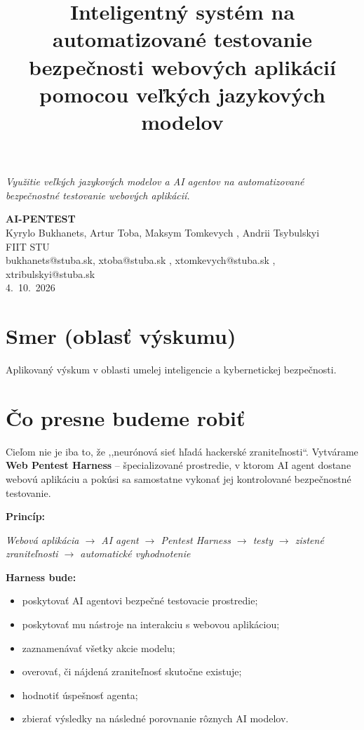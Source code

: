 \documentclass[11pt,a4paper]{article}
\title{\textbf{Inteligentný systém na automatizované testovanie bezpečnosti webových aplikácií pomocou veľkých jazykových modelov}}
\author{}
\date{}
\begin{document}
\maketitle
\vspace{-1cm}

\noindent\textit{Využitie veľkých jazykových modelov a AI agentov na automatizované bezpečnostné testovanie webových aplikácií.}

\bigskip


\begin{center}
{\LARGE \textbf{AI-PENTEST}}\\[3mm]
Kyrylo Bukhanets, Artur Toba, Maksym Tomkevych , Andrii Tsybulskyi\\
FIIT STU\\
bukhanets@stuba.sk, xtoba@stuba.sk , xtomkevych@stuba.sk , xtribulskyi@stuba.sk\\
4.\ 10.\ 2026
\end{center}

\section*{Smer (oblasť výskumu)}

\noindent Aplikovaný výskum v oblasti umelej inteligencie a kybernetickej bezpečnosti.

\section*{Čo presne budeme robiť}

\noindent
Cieľom nie je iba to, že ,,neurónová sieť hľadá hackerské zraniteľnosti``. Vytvárame \textbf{Web Pentest Harness} -- špecializované prostredie, v ktorom AI agent dostane webovú aplikáciu a pokúsi sa samostatne vykonať jej kontrolované bezpečnostné testovanie.

\medskip
\noindent\textbf{Princíp:}

\begin{center}
\textit{Webová aplikácia $\rightarrow$ AI agent $\rightarrow$ Pentest Harness $\rightarrow$ testy $\rightarrow$ zistené zraniteľnosti $\rightarrow$ automatické vyhodnotenie}
\end{center}

\noindent\textbf{Harness bude:}
\begin{itemize}
\item poskytovať AI agentovi bezpečné testovacie prostredie;
\item poskytovať mu nástroje na interakciu s webovou aplikáciou;
\item zaznamenávať všetky akcie modelu;
\item overovať, či nájdená zraniteľnosť skutočne existuje;
\item hodnotiť úspešnosť agenta;
\item zbierať výsledky na následné porovnanie rôznych AI modelov.
\end{itemize}
\end{document}
